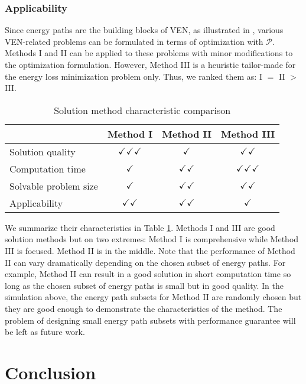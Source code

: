\documentclass[journal]{IEEEtran}
\begin{document}
\subsubsection{Applicability}
Since energy paths are the building blocks of VEN, as illustrated in \cite{VEN}, various VEN-related problems can be formulated in terms of optimization with $\mathcal{P}$. Methods I and II can be applied to these problems with minor modifications to the optimization formulation. However, Method III is a heuristic  tailor-made for the energy loss minimization problem only. Thus, we ranked them as: I $=$ II $>$ III.

\begin{table}[!t]
\renewcommand{\arraystretch}{1.1}
\caption{Solution method characteristic comparison}
\label{tab:comparison}
\centering
\begin{tabular}{p{2.5cm}|c | c|c}
\hline\hline
				& Method I 	& Method II & Method III 	\\
\hline
Solution quality & $\checkmark\checkmark\checkmark$		& $\checkmark$	& $\checkmark\checkmark$ \\
Computation time		& $\checkmark$	& $\checkmark\checkmark$ & $\checkmark\checkmark\checkmark$  \\
Solvable problem size &	$\checkmark$ 		& $\checkmark\checkmark$ 	& $\checkmark\checkmark$	\\
Applicability			 & $\checkmark\checkmark$ 		& $\checkmark\checkmark$ & $\checkmark$ \\
\hline\hline
\end{tabular}
\end{table}

We summarize their characteristics in Table  \ref{tab:comparison}. Methods I and III are good solution methods but  on two extremes: Method I is  comprehensive while Method III is focused. Method II is in the middle. Note that the performance of Method II can vary dramatically depending on the chosen subset of energy paths. For example, Method II can result in a good solution in short computation time so long as the chosen subset of energy paths is small but in good quality.
In the simulation above, the energy path subsets for Method II are randomly chosen but they are good enough to demonstrate the characteristics of the method. The problem of designing small energy path subsets with performance guarantee will be left as future work.  






\section{Conclusion} \label{sec:conclusion}
\end{document}
